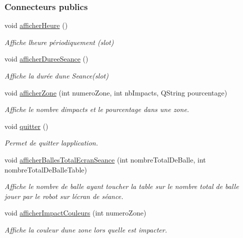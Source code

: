\subsubsection*{Connecteurs publics}
\begin{DoxyCompactItemize}
\item 
void \hyperlink{class_ttpa_ihm_ad1fc60bf431308d8e52cbc5e35d0d3de}{afficher\+Heure} ()
\begin{DoxyCompactList}\small\item\em Affiche l\textquotesingle{}heure périodiquement (slot) \end{DoxyCompactList}\item 
void \hyperlink{class_ttpa_ihm_a266897eb263e584b40fc2b7c26347623}{afficher\+Duree\+Seance} ()
\begin{DoxyCompactList}\small\item\em Affiche la durée d\textquotesingle{}une Seance(slot) \end{DoxyCompactList}\item 
void \hyperlink{class_ttpa_ihm_a3b00f90707811240c7dcfe8ed3dce783}{afficher\+Zone} (int numero\+Zone, int nb\+Impacts, Q\+String pourcentage)
\begin{DoxyCompactList}\small\item\em Affiche le nombre d\textquotesingle{}impacts et le pourcentage dans une zone. \end{DoxyCompactList}\item 
void \hyperlink{class_ttpa_ihm_af14988cbed7051af4eba326123cfb177}{quitter} ()
\begin{DoxyCompactList}\small\item\em Permet de quitter l\textquotesingle{}application. \end{DoxyCompactList}\item 
void \hyperlink{class_ttpa_ihm_a7b8784d0550cf910b89006365bc8383a}{afficher\+Balles\+Total\+Ecran\+Seance} (int nombre\+Total\+De\+Balle, int nombre\+Total\+De\+Balle\+Table)
\begin{DoxyCompactList}\small\item\em Affiche le nombre de balle ayant toucher la table sur le nombre total de balle jouer par le robot sur l\textquotesingle{}écran de séance. \end{DoxyCompactList}\item 
void \hyperlink{class_ttpa_ihm_a6e3cd3828ce5d165497e343bdb15cd87}{afficher\+Impact\+Couleurs} (int numero\+Zone)
\begin{DoxyCompactList}\small\item\em Affiche la couleur d\textquotesingle{}une zone lors qu\textquotesingle{}elle est impacter. \end{DoxyCompactList}\item 

\end{DoxyCompactItemize}
